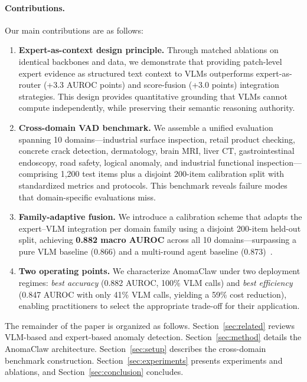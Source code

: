 \paragraph{Contributions.}
Our main contributions are as follows:
\begin{enumerate}[leftmargin=*,itemsep=2pt,topsep=3pt]
    \item \textbf{Expert-as-context design principle.}
    Through matched ablations on identical backbones and data, we demonstrate that providing patch-level expert evidence as structured text context to VLMs outperforms expert-as-router (+3.3 AUROC points) and score-fusion (+3.0 points) integration strategies.
    This design provides quantitative grounding that VLMs cannot compute independently, while preserving their semantic reasoning authority.

    \item \textbf{Cross-domain VAD benchmark.}
    We assemble a unified evaluation spanning 10 domains---industrial surface inspection, retail product checking, concrete crack detection, dermatology, brain MRI, liver CT, gastrointestinal endoscopy, road safety, logical anomaly, and industrial functional inspection---comprising 1{,}200 test items plus a disjoint 200-item calibration split with standardized metrics and protocols.
    This benchmark reveals failure modes that domain-specific evaluations miss.

    \item \textbf{Family-adaptive fusion.}
    We introduce a calibration scheme that adapts the expert--VLM integration per domain family using a disjoint 200-item held-out split, achieving \textbf{0.882 macro AUROC} across all 10 domains---surpassing a pure VLM baseline (0.866) and a multi-round agent baseline (0.873)~\citep{zhang2025agentiad}.

    \item \textbf{Two operating points.}
    We characterize AnomaClaw under two deployment regimes: \emph{best accuracy} (0.882 AUROC, 100\% VLM calls) and \emph{best efficiency} (0.847 AUROC with only 41\% VLM calls, yielding a 59\% cost reduction), enabling practitioners to select the appropriate trade-off for their application.
\end{enumerate}

The remainder of the paper is organized as follows.
Section~\ref{sec:related} reviews VLM-based and expert-based anomaly detection.
Section~\ref{sec:method} details the AnomaClaw architecture.
Section~\ref{sec:setup} describes the cross-domain benchmark construction.
Section~\ref{sec:experiments} presents experiments and ablations, and Section~\ref{sec:conclusion} concludes.
